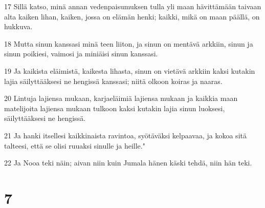 \par 17 Sillä katso, minä annan vedenpaisumuksen tulla yli maan hävittämään taivaan alta kaiken lihan, kaiken, jossa on elämän henki; kaikki, mikä on maan päällä, on hukkuva.
\par 18 Mutta sinun kanssasi minä teen liiton, ja sinun on mentävä arkkiin, sinun ja sinun poikiesi, vaimosi ja miniäisi sinun kanssasi.
\par 19 Ja kaikista eläimistä, kaikesta lihasta, sinun on vietävä arkkiin kaksi kutakin lajia säilyttääksesi ne hengissä kanssasi; niitä olkoon koiras ja naaras.
\par 20 Lintuja lajiensa mukaan, karjaeläimiä lajiensa mukaan ja kaikkia maan matelijoita lajiensa mukaan tulkoon kaksi kutakin lajia sinun luoksesi, säilyttääksesi ne hengissä.
\par 21 Ja hanki itsellesi kaikkinaista ravintoa, syötäväksi kelpaavaa, ja kokoa sitä talteesi, että se olisi ruuaksi sinulle ja heille."
\par 22 Ja Nooa teki näin; aivan niin kuin Jumala hänen käski tehdä, niin hän teki.

\chapter{7}

